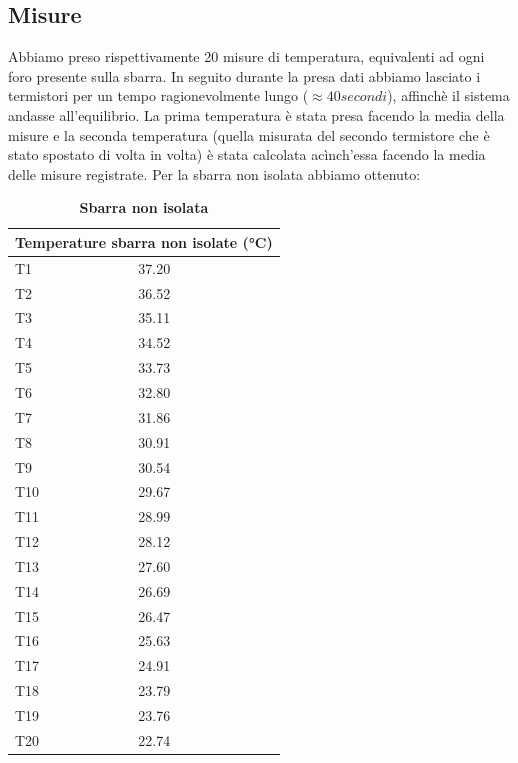 \documentclass[a4paper,10pt]{article}
\begin{document}
\subsection{Misure}
Abbiamo preso rispettivamente 20 misure di temperatura, equivalenti ad ogni foro presente sulla sbarra.
In seguito durante la presa dati abbiamo lasciato i termistori per un tempo ragionevolmente lungo ($\approx 40 secondi$), affinchè il sistema andasse all'equilibrio.
La prima temperatura è stata presa facendo la media della misure e la seconda temperatura (quella misurata del secondo termistore che è stato spostato di volta in volta) è stata calcolata 
acìnch'essa facendo la media delle misure registrate.
Per la sbarra non isolata abbiamo ottenuto:
\begin{table}[H]
\centering
\caption{\textbf{Sbarra non isolata}}
\label{my-label}
\begin{tabular}{|l|l|}
\hline
\multicolumn{2}{|l|}{Temperature sbarra non isolate (°C)} \\ \hline
T1                         & 37.20                        \\ \hline
T2                         & 36.52                        \\ \hline
T3                         & 35.11                        \\ \hline
T4                         & 34.52                        \\ \hline
T5                         & 33.73                        \\ \hline
T6                         & 32.80                        \\ \hline
T7                         & 31.86                        \\ \hline
T8                         & 30.91                        \\ \hline
T9                         & 30.54                        \\ \hline
T10                        & 29.67                        \\ \hline
T11                        & 28.99                        \\ \hline
T12                        & 28.12                        \\ \hline
T13                        & 27.60                        \\ \hline
T14                        & 26.69                        \\ \hline
T15                        & 26.47                        \\ \hline
T16                        & 25.63                        \\ \hline
T17                        & 24.91                        \\ \hline
T18                        & 23.79                        \\ \hline
T19                        & 23.76                        \\ \hline
T20                        & 22.74                        \\ \hline
\end{tabular}
\end{table}
\end{document}
